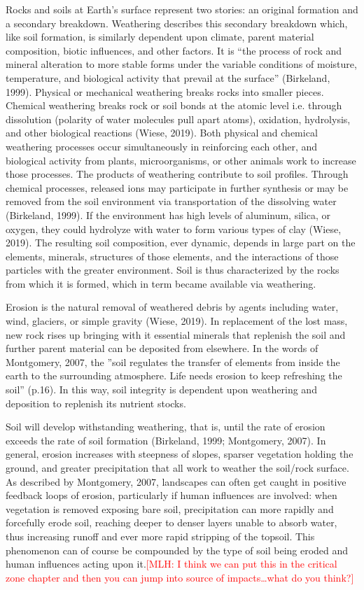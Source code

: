 \documentclass{book}\usepackage{knitr}
\newcommand{\red}[1]{\textcolor{red}{[MLH: #1]}}
\begin{document}
Rocks and soils at Earth’s surface represent two stories: an original formation and a secondary breakdown. Weathering describes this secondary breakdown which, like soil formation, is similarly dependent upon climate, parent material composition, biotic influences, and other factors. It is “the process of rock and mineral alteration to more stable forms under the variable conditions of moisture, temperature, and biological activity that prevail at the surface” (Birkeland, 1999). Physical or mechanical weathering breaks rocks into smaller pieces. Chemical weathering breaks rock or soil bonds at the atomic level i.e. through dissolution (polarity of water molecules pull apart atoms), oxidation, hydrolysis, and other biological reactions (Wiese, 2019). Both physical and chemical weathering processes occur simultaneously in reinforcing each other, and biological activity from plants, microorganisms, or other animals work to increase those processes. The products of weathering contribute to soil profiles. Through chemical processes, released ions may participate in further synthesis or may be removed from the soil environment via transportation of the dissolving water (Birkeland, 1999). If the environment has high levels of aluminum, silica, or oxygen, they could hydrolyze with water to form various types of clay (Wiese, 2019). The resulting soil composition, ever dynamic, depends in large part on the elements, minerals, structures of those elements, and the interactions of those particles with the greater environment. Soil is thus characterized by the rocks from which it is formed, which in term became available via weathering.

Erosion is the natural removal of weathered debris by agents including water, wind, glaciers, or simple gravity (Wiese, 2019). In replacement of the lost mass, new rock rises up bringing with it essential minerals that replenish the soil and further parent material can be deposited from elsewhere. In the words of Montgomery, 2007, the ''soil regulates the transfer of elements from inside the earth to the surrounding atmosphere. Life needs erosion to keep refreshing the soil'' (p.16). In this way, soil integrity is dependent upon weathering and deposition to replenish its nutrient stocks.

Soil will develop withstanding weathering, that is, until the rate of erosion exceeds the rate of soil formation (Birkeland, 1999; Montgomery, 2007). In general, erosion increases with steepness of slopes, sparser vegetation holding the ground, and greater precipitation that all work to weather the soil/rock surface. As described by Montgomery, 2007, landscapes can often get caught in positive feedback loops of erosion, particularly if human influences are involved: when vegetation is removed exposing bare soil, precipitation can more rapidly and forcefully erode soil, reaching deeper to denser layers unable to absorb water, thus increasing runoff and ever more rapid stripping of the topsoil. This phenomenon can of course be compounded by the type of soil being eroded and human influences acting upon it.\red{I think we can put this in the critical zone chapter and then you can jump into source of impacts\ldots what do you think?}
\end{document}
